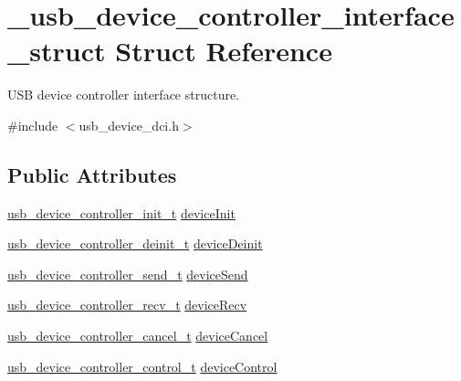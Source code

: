\hypertarget{struct__usb__device__controller__interface__struct}{\section{\-\_\-usb\-\_\-device\-\_\-controller\-\_\-interface\-\_\-struct Struct Reference}
\label{struct__usb__device__controller__interface__struct}
}


U\-S\-B device controller interface structure.  




{\ttfamily \#include $<$usb\-\_\-device\-\_\-dci.\-h$>$}

\subsection*{Public Attributes}
\begin{DoxyCompactItemize}
\item 
\hyperlink{group__usb__device__controller__driver_ga7f8af48e2f4f886f521f8128b6a05e9b}{usb\-\_\-device\-\_\-controller\-\_\-init\-\_\-t} \hyperlink{struct__usb__device__controller__interface__struct_a2a8addd32dd6a3cb66f01f6912585ae1}{device\-Init}
\item 
\hyperlink{group__usb__device__controller__driver_ga283139f5df38421250c30a094f34088d}{usb\-\_\-device\-\_\-controller\-\_\-deinit\-\_\-t} \hyperlink{struct__usb__device__controller__interface__struct_a8910543e7559d2e3046f718fb5dffa14}{device\-Deinit}
\item 
\hyperlink{group__usb__device__controller__driver_ga5879c987e628c5c5a27b5fcc685e90c8}{usb\-\_\-device\-\_\-controller\-\_\-send\-\_\-t} \hyperlink{struct__usb__device__controller__interface__struct_a316b3b4a883b7e9f4007e30f28a463ff}{device\-Send}
\item 
\hyperlink{group__usb__device__controller__driver_gac14df7129a0dc5e7c0b7148b05992dc8}{usb\-\_\-device\-\_\-controller\-\_\-recv\-\_\-t} \hyperlink{struct__usb__device__controller__interface__struct_ac58934254b0e4122309de852bc1399c4}{device\-Recv}
\item 
\hyperlink{group__usb__device__controller__driver_ga476c2b07d6a5e467e104568aad59ef44}{usb\-\_\-device\-\_\-controller\-\_\-cancel\-\_\-t} \hyperlink{struct__usb__device__controller__interface__struct_aeba4e88996e097bd9b88b6219c60c5c2}{device\-Cancel}
\item 
\hyperlink{group__usb__device__controller__driver_gae484b958b5a84af6ce5921f8538ff1c4}{usb\-\_\-device\-\_\-controller\-\_\-control\-\_\-t} \hyperlink{struct__usb__device__controller__interface__struct_ad4f40ea9e2cfa7df3a40f601f202f36a}{device\-Control}
\end{DoxyCompactItemize}


